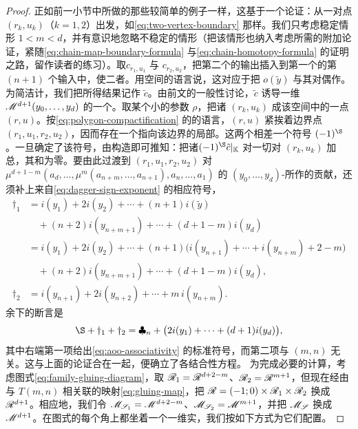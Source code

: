 \begin{proof}
正如前一小节中所做的那些较简单的例子一样，这基于一个\trGluing{}论证：从一对\trIsolated{}点 $(r_k,u_k)$（$k=1,2$）出发，如\eqref{eq:two-vertex-boundary} 那样。我们只考虑稳定情形 $1<m<d$，并有意识地忽略不稳定的情形（把该情形也纳入考虑所需的附加论证，紧随\eqref{eq:chain-map-boundary-formula} 与\eqref{eq:chain-homotopy-formula} 的证明之路，留作读者的练习）。取\trIsomorphism{}$c_{r_1,u_1}$ 与 $c_{r_2,u_2}$，把第二个的输出插入到第一个的第 $(n+1)$ 个输入中，使二者\trComposition。用\trOrientation{}空间的语言说，这对应于把 $o(\tilde{y})$ 与其对偶作\trPairing。为简洁计，我们把所得结果记作 $\tilde{c}$。由前文的一般性讨论，$\tilde{c}$ 诱导一维\trModuliSpace{}$\mathscr{M}^{d+1}(y_0,\ldots,y_d)$ 的一个\trOrientation。取某个小的参数 $\rho$，把诸 $(r_k,u_k)$ \trGluing{}成该空间中的一点 $(r,u)$。按\eqref{eq:polygon-compactification} 的\trGromov{}\trCompactification{}的语言，$(r,u)$ 紧挨着边界点 $(r_1,u_1,r_2,u_2)$，因而存在一个指向该边界的\trCanonical{}局部\trOrientation。这两个\trOrientation{}相差一个符号 $(-1)^{\text{\S}}$。一旦确定了该符号，由构造即可推知：把诸\trNormalization{}$(-1)^{\text{\S}}\tilde{c}|_\KK$ 对一切对 $(r_k,u_k)$ 加总，其和为零。要由此过渡到 $(r_1,u_1,r_2,u_2)$ 对 $\mu^{d+1-m}(a_d,\ldots,\mu^m(a_{n+m},\ldots,a_{n+1}),a_n,\ldots,a_1)$ 的 $(y_0,\ldots,y_d)$-\trCoefficients{}所作的贡献，还须补上来自\eqref{eq:dagger-sign-exponent} 的相应符号，
\begin{equation*}
\begin{aligned}
\dagger_1&=i(y_1)+2i(y_2)+\cdots+(n+1)i(\tilde{y})\\
&\quad+(n+2)i(y_{n+m+1})+\cdots+(d+1-m)i(y_d)\\
&=i(y_1)+2i(y_2)+\cdots+(n+1)\bigl(i(y_{n+1})+\cdots+i(y_{n+m})+2-m\bigr)\\
&\quad+(n+2)i(y_{n+m+1})+\cdots+(d+1-m)i(y_d),\\
\dagger_2&=i(y_{n+1})+2i(y_{n+2})+\cdots+m\,i(y_{n+m}).
\end{aligned}
\end{equation*}
余下的断言是
\begin{equation}\label{eq:sign-identity-clubsuit}
\text{\S}+\dagger_1+\dagger_2=\clubsuit_n+\bigl(2i(y_1)+\cdots+(d+1)i(y_d)\bigr),
\end{equation}
其中右端第一项给出\eqref{eq:aoo-associativity} 的标准符号，而第二项与 $(m,n)$ 无关。这与上面的论证合在一起，便确立了各结合性方程。
为完成必要的计算，考虑图式\eqref{eq:family-gluing-diagram}，取 $\mathscr{R}_1=\mathscr{R}^{d+2-m}$、$\mathscr{R}_2=\mathscr{R}^{m+1}$，但现在经由与 $T(m,n)$ 相关联的映射\eqref{eq:gluing-map}，把 $\mathscr{R}=(-1;0)\times\mathscr{R}_1\times\mathscr{R}_2$ 换成 $\mathscr{R}^{d+1}$。相应地，我们令 $\mathscr{M}_{\mathscr{S}_1}=\mathscr{M}^{d+2-m}$、$\mathscr{M}_{\mathscr{S}_2}=\mathscr{M}^{m+1}$，并把 $\mathscr{M}_{\mathscr{S}}$ 换成 $\mathscr{M}^{d+1}$。在图式的每个角上都坐着一个一维实\trVectorSpace，我们按如下方式为它们配置\trOrientation。

\end{proof}
